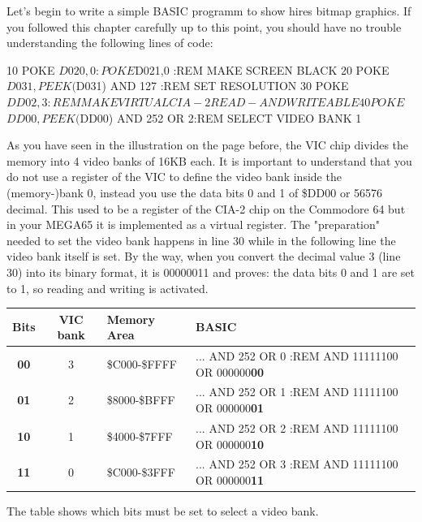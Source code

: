 Let's begin to write a simple BASIC programm to show hires bitmap graphics. If you followed this chapter carefully up to this point, you should have no trouble understanding the following lines of code:

\begin{screenoutput}
10 POKE $D020,0 : POKE $D021,0          :REM MAKE SCREEN BLACK
20 POKE $D031, PEEK($D031) AND 127      :REM SET RESOLUTION
30 POKE $DD02, 3                        :REM MAKE VIRTUAL CIA-2 READ- AND WRITEABLE 
40 POKE $$DD00, PEEK($DD00) AND 252 OR 2:REM SELECT VIDEO BANK 1
\end{screenoutput}

As you have seen in the illustration on the page before, the VIC chip divides the memory into 4 video banks of 16KB each. It is important to understand that you do not use a register of the VIC to define the video bank inside the (memory-)bank 0, instead you use the data bits 0 and 1 of \$DD00 or 56576 decimal. This used to be a register of the CIA-2 chip on the Commodore 64 but in your MEGA65 it is implemented as a virtual register. The "preparation" needed to set the video bank happens in line 30 while in the following line the video bank itself is set. By the way, when you convert the decimal value 3 (line 30) into its binary format, it is 00000011 and proves: the data bits 0 and 1 are set to 1, so reading and writing is activated.

\begin{tabular}{|c|c|l|l|}
	\hline
	Bits & VIC bank & Memory Area & BASIC \\
	\hline
	 \textbf{00} & 3 & \$C000-\$FFFF & ... AND 252 OR 0 :REM AND 11111100 OR 000000\textbf{00} \\
	 \textbf{01} & 2 & \$8000-\$BFFF & ... AND 252 OR 1 :REM AND 11111100 OR 000000\textbf{01} \\
	 \textbf{10} & 1 & \$4000-\$7FFF & ... AND 252 OR 2 :REM AND 11111100 OR 000000\textbf{10} \\
	 \textbf{11} & 0 & \$C000-\$3FFF & ... AND 252 OR 3 :REM AND 11111100 OR 000000\textbf{11} \\
	\hline
\end{tabular}

The table shows which bits must be set to select a video bank. 